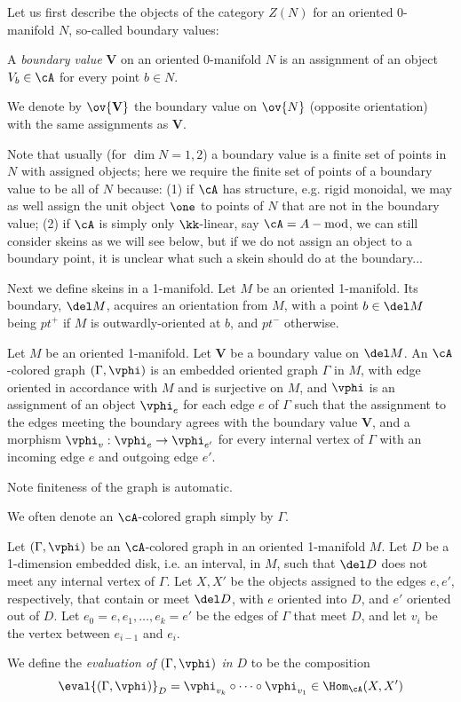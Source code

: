 \documentclass[12pt]{article}
\newcommand{\VV}{{\mathbf{V}}}
\begin{document}
Let us first describe the objects of the category
$Z(N)$ for an oriented 0-manifold $N$,
so-called boundary values:

\begin{definition}
A \emph{boundary value} $\VV$ on an oriented 0-manifold $N$
is an assignment of an object $V_b \in \cA$
for every point $b \in N$.

We denote by $\ov{\VV}$ the boundary value on $\ov{N}$
(opposite orientation) with the same assignments as $\VV$.
\end{definition}

Note that usually (for $\dim N = 1,2$)
a boundary value is a finite set of points in $N$
with assigned objects;
here we require the finite set of points of a boundary value
to be all of $N$ because:
(1) if $\cA$ has structure, e.g. rigid monoidal,
we may as well assign the unit object $\one$ to points
of $N$ that are not in the boundary value;
(2) if $\cA$ is simply only $\kk$-linear,
say $\cA = A-\text{mod}$,
we can still consider skeins as we will see below,
but if we do not assign an object to a boundary point,
it is unclear what such a skein should do at the boundary...


Next we define skeins in a 1-manifold.
Let $M$ be an oriented 1-manifold.
Its boundary, $\del M$, acquires an orientation from $M$,
with a point $b \in \del M$ being $pt^+$ if $M$
is outwardly-oriented at $b$, and $pt^-$ otherwise.

\begin{definition}
\label{d:A-colored-graph}
Let $M$ be an oriented 1-manifold.
Let $\VV$ be a boundary value on $\del M$.
An $\cA$-colored graph $(\Gamma,\vphi)$
is an embedded oriented graph $\Gamma$ in $M$,
with edge oriented in accordance with $M$
and is surjective on $M$,
and $\vphi$ is an assignment of an object $\vphi_e$
for each edge $e$ of $\Gamma$
such that the assignment to the edges meeting the boundary
agrees with the boundary value $\VV$,
and a morphism $\vphi_v: \vphi_e \to \vphi_{e'}$
for every internal vertex of $\Gamma$
with an incoming edge $e$ and outgoing edge $e'$.
\end{definition}

Note finiteness of the graph is automatic.

We often denote an $\cA$-colored graph simply by $\Gamma$.

\begin{definition}
\label{d:local-ev}
Let $(\Gamma,\vphi)$ be an $\cA$-colored graph
in an oriented 1-manifold $M$.
Let $D$ be a 1-dimension embedded disk, i.e. an interval,
in $M$, such that $\del D$ does not meet any internal vertex
of $\Gamma$.
Let $X,X'$ be the objects assigned to the edges $e,e'$,
respectively, that contain or meet $\del D$,
with $e$ oriented into $D$, and $e'$ oriented out of $D$.
Let $e_0 = e, e_1,\ldots,e_k = e'$ be the edges
of $\Gamma$ that meet $D$, and let
$v_i$ be the vertex between $e_{i-1}$ and $e_i$.

We define the \emph{evaluation of $(\Gamma,\vphi)$ in $D$}
to be the composition
\[
\eval{(\Gamma,\vphi)}_D
= \vphi_{v_k} \circ \cdots \circ \vphi_{v_1}
\in \Hom_\cA(X,X')
\]
\end{definition}
\end{document}
